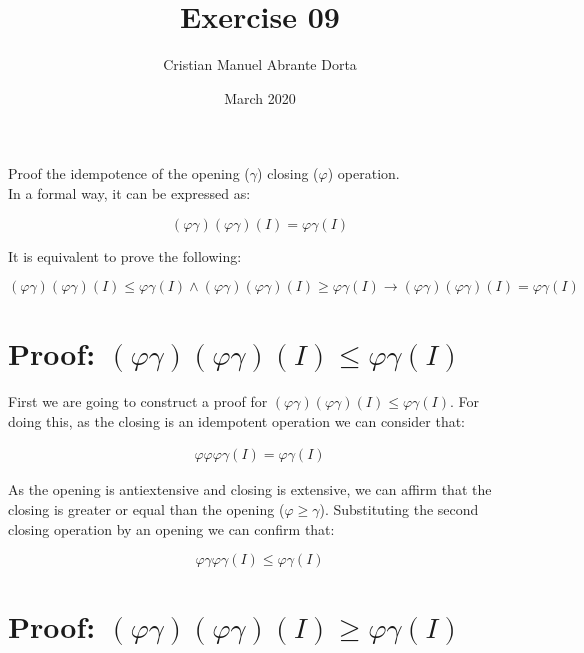 \documentclass{article}
\title{Exercise 09}
\author{Cristian Manuel Abrante Dorta}
\date{March 2020}
\begin{document}
\maketitle

Proof the idempotence of the opening ($\gamma$) closing ($\varphi$) operation.\\

In a formal way, it can be expressed as:

\begin{equation}
    (\varphi \gamma)(\varphi \gamma) (I) = \varphi \gamma(I) 
\end{equation}

It is equivalent to prove the following:

\begin{equation}
    (\varphi \gamma)(\varphi \gamma) (I) \leq \varphi \gamma(I) \land 
    (\varphi \gamma)(\varphi \gamma) (I) \geq \varphi \gamma(I)
    \rightarrow (\varphi \gamma)(\varphi \gamma) (I) = \varphi \gamma(I) 
\end{equation}

\section{Proof: $(\varphi \gamma)(\varphi \gamma) (I) \leq \varphi \gamma(I)$}

First we are going to construct a proof for $(\varphi \gamma)(\varphi \gamma) (I) \leq \varphi \gamma(I)$. For doing this, as the closing is an idempotent operation we can consider that:

\begin{equation}
\begin{split}
    \varphi \varphi \varphi \gamma(I) = \varphi \gamma(I)
\end{split}
\end{equation}

As the opening is antiextensive and closing is extensive, we can affirm that the closing is greater or equal than the opening ($\varphi \geq \gamma$). Substituting the second closing operation by an opening we can confirm that:

\begin{equation}
    \varphi \gamma \varphi \gamma(I) \leq \varphi \gamma(I)
\end{equation}

\section{Proof: $(\varphi \gamma)(\varphi \gamma) (I) \geq \varphi \gamma(I)$}
\end{document}
